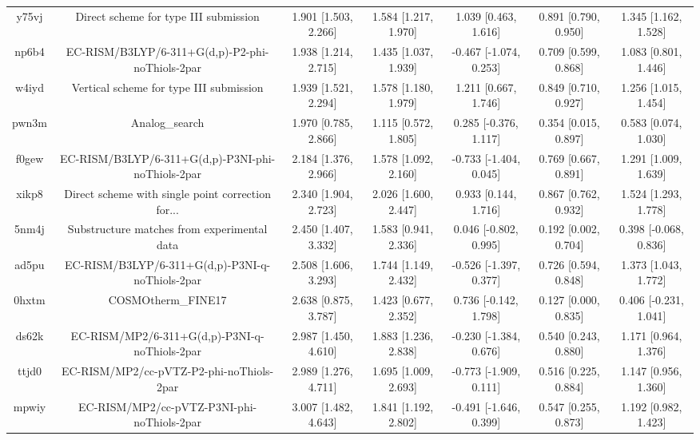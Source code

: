 \documentclass{article}
\begin{document}
\begin{center}
\begin{longtable}{|ccccccc|}
 y75vj &              Direct scheme for type III submission &  1.901 [1.503, 2.266] &  1.584 [1.217, 1.970] &     1.039 [0.463, 1.616] &  0.891 [0.790, 0.950] &   1.345 [1.162, 1.528] \\
 np6b4 &    EC-RISM/B3LYP/6-311+G(d,p)-P2-phi-noThiols-2par &  1.938 [1.214, 2.715] &  1.435 [1.037, 1.939] &   -0.467 [-1.074, 0.253] &  0.709 [0.599, 0.868] &   1.083 [0.801, 1.446] \\
 w4iyd &            Vertical scheme for type III submission &  1.939 [1.521, 2.294] &  1.578 [1.180, 1.979] &     1.211 [0.667, 1.746] &  0.849 [0.710, 0.927] &   1.256 [1.015, 1.454] \\
 pwn3m &                                     Analog\_search &  1.970 [0.785, 2.866] &  1.115 [0.572, 1.805] &    0.285 [-0.376, 1.117] &  0.354 [0.015, 0.897] &   0.583 [0.074, 1.030] \\
 f0gew &  EC-RISM/B3LYP/6-311+G(d,p)-P3NI-phi-noThiols-2par &  2.184 [1.376, 2.966] &  1.578 [1.092, 2.160] &   -0.733 [-1.404, 0.045] &  0.769 [0.667, 0.891] &   1.291 [1.009, 1.639] \\
 xikp8 &  Direct scheme with single point correction for... &  2.340 [1.904, 2.723] &  2.026 [1.600, 2.447] &     0.933 [0.144, 1.716] &  0.867 [0.762, 0.932] &   1.524 [1.293, 1.778] \\
 5nm4j &        Substructure matches from experimental data &  2.450 [1.407, 3.332] &  1.583 [0.941, 2.336] &    0.046 [-0.802, 0.995] &  0.192 [0.002, 0.704] &  0.398 [-0.068, 0.836] \\
 ad5pu &    EC-RISM/B3LYP/6-311+G(d,p)-P3NI-q-noThiols-2par &  2.508 [1.606, 3.293] &  1.744 [1.149, 2.432] &   -0.526 [-1.397, 0.377] &  0.726 [0.594, 0.848] &   1.373 [1.043, 1.772] \\
 0hxtm &                                 COSMOtherm\_FINE17 &  2.638 [0.875, 3.787] &  1.423 [0.677, 2.352] &    0.736 [-0.142, 1.798] &  0.127 [0.000, 0.835] &  0.406 [-0.231, 1.041] \\
 ds62k &      EC-RISM/MP2/6-311+G(d,p)-P3NI-q-noThiols-2par &  2.987 [1.450, 4.610] &  1.883 [1.236, 2.838] &   -0.230 [-1.384, 0.676] &  0.540 [0.243, 0.880] &   1.171 [0.964, 1.376] \\
 ttjd0 &           EC-RISM/MP2/cc-pVTZ-P2-phi-noThiols-2par &  2.989 [1.276, 4.711] &  1.695 [1.009, 2.693] &   -0.773 [-1.909, 0.111] &  0.516 [0.225, 0.884] &   1.147 [0.956, 1.360] \\
 mpwiy &         EC-RISM/MP2/cc-pVTZ-P3NI-phi-noThiols-2par &  3.007 [1.482, 4.643] &  1.841 [1.192, 2.802] &   -0.491 [-1.646, 0.399] &  0.547 [0.255, 0.873] &   1.192 [0.982, 1.423] \\

\end{longtable}
\end{center}
\end{document}
